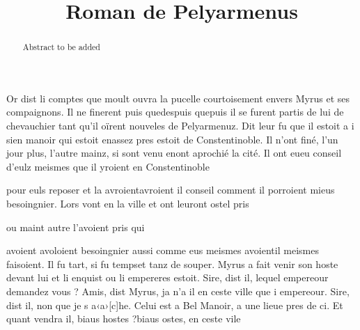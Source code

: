 \documentclass{article}
\begin{document}
\date{}
        \title{Roman de Pelyarmenus}
\maketitle

\begin{abstract}
Abstract to be added
\end{abstract}
\begin{pages}
\beginnumbering
        
   
   
      
         
            \pstart Or dist li
                  comptes que moult ouvra la pucelle
               courtoisement envers Myrus et ses compaignons. Il
               ne finerent 
                  puis quedespuis quepuis il se furent 
                  partis de lui de chevauchier tant qu’il oïrent nouveles de Pelyarmenuz. Dit leur fu que il
                  estoit a i sien manoir qui 
                     estoit enassez pres estoit de
                  Constentinoble. Il n’ont finé,
               l’un jour plus, l’autre mainz, si 
                  sont venu enont aprochié
               la cité. Il 
                  ont eueu conseil d’eulz meismes que il yroient en Constentinoble
               
                  pour euls reposer et la 
                  avroientavroient il conseil comment il porroient mieus besoingnier. Lors 
                  vont en la ville
                     et ont leuront ostel pris 

                  ou maint autre l’avoient pris qui 

                        avoient avoloient besoingnier aussi comme 
                        eus meismes avoientil meismes faisoient. Il fu tart,
                  si fu tempset tanz de souper. Myrus a fait venir son hoste devant lui et li enquist ou li empereres estoit. Sire, dist il, lequel empereour demandez vous ?
               Amis, dist Myrus,
                  ja n’a il en ceste ville que
                     i empereour.
               Sire, dist il, non que je s
                     a‹a›[c]he. Celui est a Bel Manoir, a une
                  lieue pres de ci.
               Et quant vendra il, 
                     biaus hostes ?biaus ostes, en ceste vile
               

\end{pages}
\end{document}
